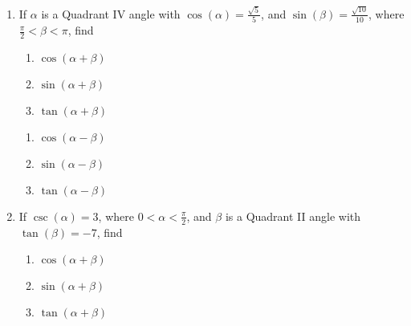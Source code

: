 \begin{enumerate}

\setcounter{enumi}{\value{HW}}

\item  If $\alpha$ is a Quadrant IV angle with $\cos(\alpha) = \frac{\sqrt{5}}{5}$, and  $\sin(\beta) = \frac{\sqrt{10}}{10}$, where $\frac{\pi}{2} < \beta < \pi$, find

\begin{multicols}{3}

\begin{enumerate}

\item  $\cos(\alpha + \beta)$
\item  $\sin(\alpha + \beta)$
\item  $\tan(\alpha + \beta)$

\setcounter{HWindent}{\value{enumii}}

\end{enumerate}

\end{multicols}

\begin{multicols}{3}

\begin{enumerate}

\setcounter{enumii}{\value{HWindent}}

\item  $\cos(\alpha - \beta)$
\item  $\sin(\alpha - \beta)$
\item  $\tan(\alpha - \beta)$

\end{enumerate}

\end{multicols}

\item  If $\csc(\alpha) = 3$, where $0 < \alpha < \frac{\pi}{2}$, and $\beta$ is a Quadrant II angle with $\tan(\beta) = -7$, find

\begin{multicols}{3}

\begin{enumerate}

\item  $\cos(\alpha + \beta)$
\item  $\sin(\alpha + \beta)$
\item  $\tan(\alpha + \beta)$

\setcounter{HWindent}{\value{enumii}}


\end{enumerate}
\end{multicols}
\end{enumerate}
